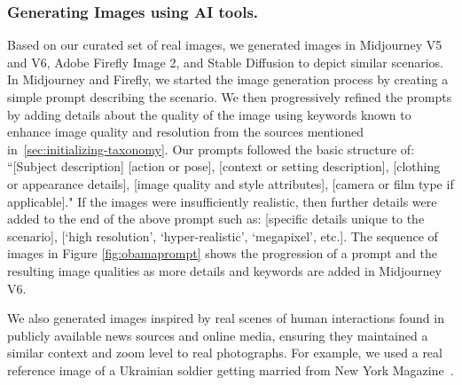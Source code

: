 \subsubsection{Generating Images using AI tools.} Based on our curated set of real images, we generated images in Midjourney V5 and V6, Adobe Firefly Image 2, and Stable Diffusion to depict similar scenarios. In Midjourney and Firefly, we started the image generation process by creating a simple prompt describing the scenario. We then progressively refined the prompts by adding details about the quality of the image using keywords known to enhance image quality and resolution from the sources mentioned in~\autoref{sec:initializing-taxonomy}. Our prompts followed the basic structure of: ``[Subject description] [action or pose], [context or setting description], [clothing or appearance details], [image quality and style attributes], [camera or film type if applicable]." If the images were insufficiently realistic, then further details were added to the end of the above prompt such as: [specific details unique to the scenario], [`high resolution', `hyper-realistic', `megapixel', etc.]. The sequence of images in Figure \ref{fig:obamaprompt} shows the progression of a prompt and the resulting image qualities as more details and keywords are added in Midjourney V6. 

We also generated images inspired by real scenes of human interactions found in publicly available news sources and online media, ensuring they maintained a similar context and zoom level to real photographs. For example, we used a real reference image of a Ukrainian soldier getting married from New York Magazine~\cite{nymag2024ukraine}.

